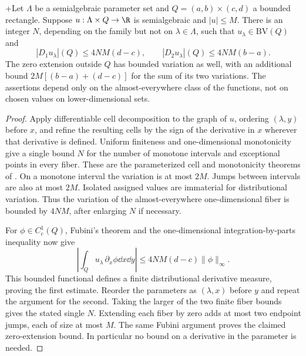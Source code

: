 \begin{proposition}
\label{prop:semialgebraic-slicing}+Let $\Lambda$ be a semialgebraic parameter set and
$Q=(a,b)\times(c,d)$ a bounded rectangle. Suppose
$u:\Lambda\times Q\to\R$ is semialgebraic and $|u|\le M$.
There is an integer $N$, depending on the family but not on
$\lambda\in\Lambda$, such that $u_\lambda\in\mathrm{BV}(Q)$ and
\begin{equation}\label{eq:slicing-variation-bound}
 |D_1u_\lambda|(Q)\le 4NM(d-c),\qquad
 |D_2u_\lambda|(Q)\le 4NM(b-a).
\end{equation}
The zero extension outside $Q$ has bounded variation as well, with an
additional bound $2M[(b-a)+(d-c)]$ for the sum of its two variations.
The assertions depend only on the almost-everywhere class of the
functions, not on chosen values on lower-dimensional sets.
\end{proposition}
\begin{proof}
Apply differentiable cell decomposition to the graph of $u$, ordering
$(\lambda,y)$ before $x$, and refine the resulting cells by the sign
of the derivative in $x$ wherever that derivative is defined. Uniform
finiteness and one-dimensional monotonicity give a single bound $N$
for the number of monotone intervals and exceptional points in every
fiber. These are the parameterized cell and monotonicity theorems of
\cite[Sections 2.1--2.2 and 6.2]{Coste}. On a monotone interval the
variation is at most $2M$. Jumps between intervals are also at most
$2M$. Isolated assigned values are immaterial for distributional
variation. Thus the variation of the almost-everywhere one-dimensional
fiber is bounded by $4NM$, after enlarging $N$ if necessary.

For $\phi\in C_c^1(Q)$, Fubini's theorem and the one-dimensional
integration-by-parts inequality now give
\[
 \left|\int_Q u_\lambda\,\partial_x\phi\dd x\dd y\right|
 \le 4NM(d-c)\|\phi\|_\infty.
\]
This bounded functional defines a finite distributional derivative
measure, proving the first estimate. Reorder the parameters as
$(\lambda,x)$ before $y$ and repeat the argument for the second.
Taking the larger of the two finite fiber bounds gives the stated
single $N$. Extending each fiber by zero adds at most two endpoint
jumps, each of size at most $M$. The same Fubini argument proves the
claimed zero-extension bound. In particular no bound on a derivative
in the parameter is needed.
\end{proof}

